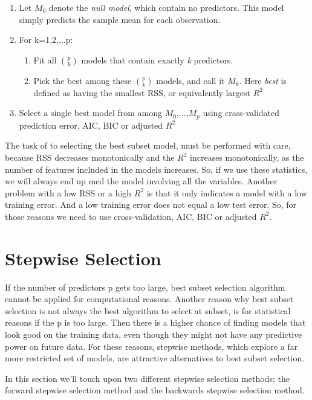 \begin{enumerate}
	\item Let $M_0$ denote the \textit{null model}, which contain no predictors. This model simply predicts the sample mean for each observation.
	
	\item For k=1,2,...p:
	\begin{enumerate}
		\item Fit all $\binom{p}{k}$ models that contain exactly \textit{k} predictors.
		
		\item Pick the best among these $\binom{p}{k}$ models, and call it $M_k$. Here \textit{best} is defined as having the smallest RSS, or equivalently largest $R^2$
	\end{enumerate}
	\item Select a single best model from among $M_0$,...,$M_p$ using crass-validated prediction error, AIC, BIC or adjusted $R^2$
\end{enumerate}


The task of to selecting the best subset model, must be performed with care, because RSS decreases monotonically and the $R^2$ increases monotonically, as the number of features included in the models increases. So, if we use these statistics, we will always end up med the model involving all the variables. 
Another problem with a low RSS or a high $R^2$ is that it only indicates a model with a low training error. And a low training error does not equal a low test error. So, for those reasons we need to use cross-validation, AIC, BIC or adjusted $R^2$. 

\section{Stepwise Selection}
If the number of predictors p gets too large, best subset selection algorithm cannot be applied for computational reasons. Another reason why best subset selection is not always the best algorithm to select at subset, is for statistical reasons if the p is too large. Then there is a higher chance of finding models that look good on the training data, even though they might not have any predictive power on future data. 
For these reasons, stepwise methods, which explore a far more restricted set of models, are attractive alternatives to best subset selection. 

In this section we'll touch upon two different stepwise selection methods; the forward stepwise selection method and the backwards stepwise selection method.

